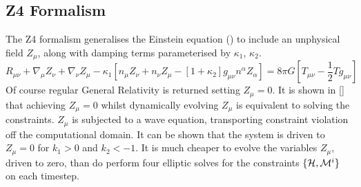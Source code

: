 \subsection{Z4 Formalism}
The Z4 formalism \cite{z4} generalises the Einstein equation () to include an unphysical field $Z_\mu$, along with damping terms parameterised by $\kappa_1$, $\kappa_2$. 
\begin{equation} R_{\mu\nu} + \nabla_\mu Z_\nu + \nabla_\nu Z_\mu - \kappa_1\left[ n_\mu Z_\nu + n_\nu Z_\mu - [1+\kappa_2]g_{\mu\nu}n^\alpha Z_\alpha\right] = 8\pi G \left[T_{\mu\nu}- \frac{1}{2}Tg_{\mu\nu} \right]\end{equation}
Of course regular General Relativity is returned setting $Z_\mu=0$. It is shown in [] that achieving $Z_\mu=0$ whilst dynamically evolving $Z_\mu$  is equivalent to solving the constraints. $Z_\mu$ is subjected to a wave equation, transporting constraint violation off the computational domain. It can be shown that the system is driven to $Z_\mu =0$ for $k_1>0$ and $k_2<-1$. It is much cheaper to evolve the variables $Z_\mu$, driven to zero, than do perform four elliptic solves for the constraints $\{\mathcal{H},\mathcal{M}^i\}$ on each timestep. 

